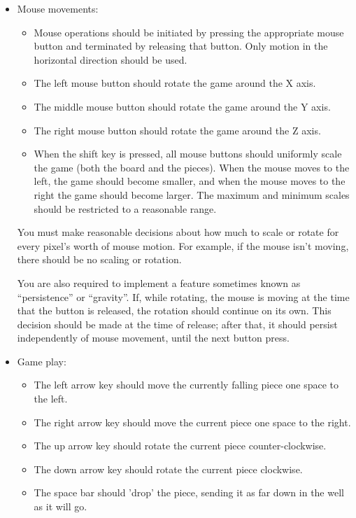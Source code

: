 \begin{itemize}
	\item Mouse movements:
	\begin{itemize}
		\item Mouse operations should be initiated by pressing the
		  appropriate mouse button and terminated by releasing
		  that button.  Only motion in the horizontal direction
		  should be used.
		\item The left mouse button should rotate the game around the
		  X axis.
		\item The middle mouse button should rotate the game around
		  the Y axis.
		\item The right mouse button should rotate the game around
		  the Z axis.
		\item When the shift key is pressed, all mouse buttons should
		  uniformly scale the game (both the board and the pieces).
		  When the mouse moves to the left, the game should become
		  smaller, and when the mouse moves
		  to the right the game should become larger.  
		  The maximum and minimum scales should be restricted to
		  a reasonable range.
	\end{itemize}

	You must make reasonable decisions about how much to scale
	or rotate for every pixel's worth of mouse motion.   For example,
	if the mouse isn't moving, there should be no scaling or rotation.

	You are also required to implement a feature sometimes known
	as ``persistence'' or ``gravity''.  If, while rotating, the mouse
	is moving at the time that the button is released, the rotation
	should continue on its own.  This decision should be made at the
	time of release; after that, it should persist independently of
	mouse movement, until the next button press.

	\item Game play:
	\begin{itemize}
		\item The left arrow key should move the currently falling piece
		  one space to the left.
		\item The right arrow key should move the current piece
		  one space to the right.
		\item The up arrow key should rotate the current piece
		  counter-clockwise.
		\item The down arrow key should rotate the current piece clockwise.
		\item The space bar should 'drop' the piece, sending it as far
		  down in the well as it will go.
	\end{itemize}
\end{itemize}

